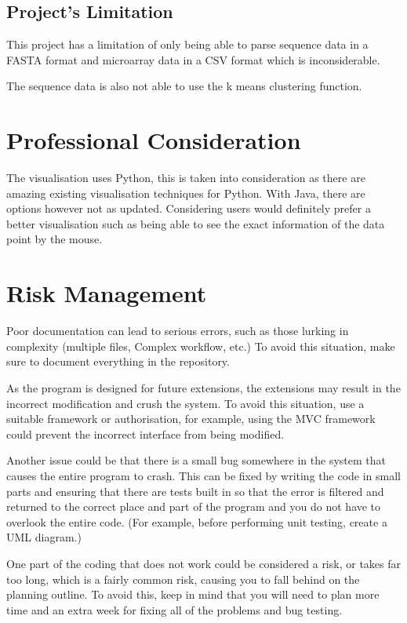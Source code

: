 \documentclass[]{final_report}
\begin{document}
\subsection{Project's Limitation}
This project has a limitation of only being able to parse sequence data in a FASTA format and microarray data in a CSV format which is inconsiderable. 

The sequence data is also not able to use the k means clustering function.

\section{Professional Consideration}
The visualisation uses Python, this is taken into consideration as there are amazing existing visualisation techniques for Python. With Java, there are options however not as updated. Considering users would definitely prefer a better visualisation such as being able to see the exact information of the data point by the mouse.

\section{Risk Management}

Poor documentation can lead to serious errors, such as those lurking in complexity (multiple files, Complex workflow, etc.) To avoid this situation, make sure to document everything in the repository.

As the program is designed for future extensions, the extensions may result in the incorrect modification and crush the system. To avoid this situation, use a suitable framework or authorisation, for example, using the MVC framework could prevent the incorrect interface from being modified.

Another issue could be that there is a small bug somewhere in the system that causes the entire program to crash.
This can be fixed by writing the code in small parts and ensuring that there are tests built in so that the error is filtered and returned to the correct place and part of the program and you do not have to overlook the entire code. (For example, before performing unit testing, create a UML diagram.)

One part of the coding that does not work could be considered a risk, or takes far too long, which is a fairly common risk, causing you to fall behind on the planning outline.
To avoid this, keep in mind that you will need to plan more time and an extra week for fixing all of the problems and bug testing.
\end{document}
